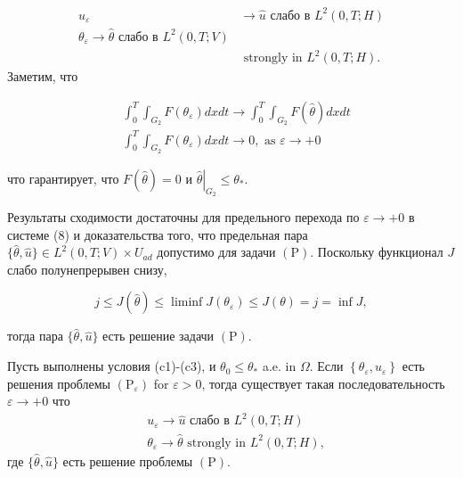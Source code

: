 \[
    \begin{aligned}
        u_{\varepsilon} & \rightarrow \widehat{u} \text { слабо в } L^{2}(0, T ; H) \\
        \theta_{\varepsilon} \rightarrow \widehat{\theta} \text { слабо в } L^{2}(0, T ; V) \\
        & \text { strongly in } L^{2}(0, T ; H).
    \end{aligned}
\]
Заметим, что

\[
    \begin{aligned}
        &\int_{0}^{T} \int_{G_{2}} F\left(\theta_{\varepsilon}\right) d x d t
        \rightarrow \int_{0}^{T} \int_{G_{2}} F(\widehat{\theta}) d x d t \\
        &\int_{0}^{T} \int_{G_{2}} F\left(\theta_{\varepsilon}\right) d x d t
        \rightarrow 0, \text { as } \varepsilon \rightarrow+0
    \end{aligned}
\]

что гарантирует, что $F(\widehat{\theta})=0$ и
$\left.\widehat{\theta}\right|_{G_{2}} \leq \theta_{*}$.

Результаты сходимости достаточны для предельного
перехода по $\varepsilon \rightarrow+0$ в системе (8)
и доказательства того, что предельная пара
$\{\widehat{\theta}, \widehat{u}\} \in L ^{2}(0, T ; V) \times U_{a d}$
допустимо для задачи $(\mathrm{P})$.
Поскольку функционал $J$ слабо полунепрерывен снизу,

\[
    j \leq J(\widehat{\theta})
    \leq \liminf J \left(\theta_{\varepsilon}\right)
    \leq J(\theta)=j=\inf J,
\]

тогда пара $\{\widehat{\theta}, \widehat{u}\}$ есть решение задачи $(\mathrm{P})$.

\begin{theorem}
    \label{th:3_2:3}
Пусть выполнены условия (c1)-(c3), и $\theta_{0} \leq \theta_{*}$ a.e. in $\Omega$.
Если $\left\{\theta_{\varepsilon}, u_{\varepsilon}\right\}$ есть решения проблемы
$\left(\mathrm{P}_{\varepsilon}\right)$ for $\varepsilon>0$, тогда существует
такая последовательность$\varepsilon \rightarrow+0$ что
\[
    \begin{aligned}
        &u_{\varepsilon} \rightarrow \widehat{u} \text { слабо в } L^{2}(0, T ; H) \\
        &\theta_{\varepsilon} \rightarrow \widehat{\theta} \text { strongly in } L^{2}(0, T ; H),
    \end{aligned}
\]
где $\{\widehat{\theta}, \widehat{u}\}$ есть решение проблемы $(\mathrm{P})$.
\end{theorem}
